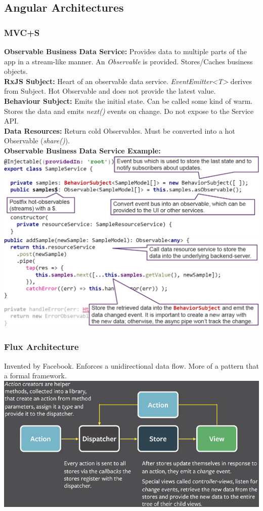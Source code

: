 \subsection{Angular Architectures}
\subsubsection{MVC+S}
\textbf{Observable Business Data Service:} Provides data to multiple parts of the app in a stream-like manner.
An \textit{Observable} is provided.
Stores/Caches business objects.\\
\textbf{RxJS Subject:} Heart of an observable data service. \textit{EventEmitter<T>} derives from Subject.
Hot Observable and does not provide the latest value.\\
\textbf{Behaviour Subject:} Emits the initial state.
Can be called some kind of warm.
Stores the data and emits \textit{next()} events on change.
Do not expose to the Service API.\\
\textbf{Data Resources:} Return cold Observables.
Must be converted into a hot Observable (\textit{share()}).\\
\textbf{Observable Business Data Service Example:}
\includegraphics[width=\linewidth]{img/angular_observable_business_data_service.png}
\includegraphics[width=\linewidth]{img/angular_observable_business_data_service2.png}

\subsubsection{Flux Architecture}
Invented by Facebook.
Enforces a unidirectional data flow.
More of a pattern that a formal framework.
\includegraphics[width=\linewidth]{img/angular_flux_pattern.png}

